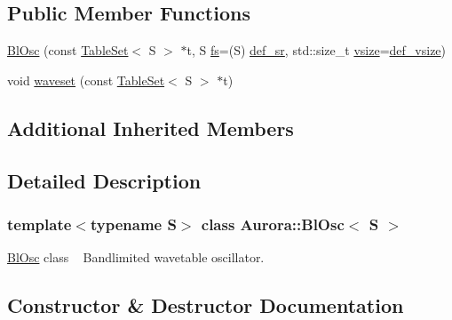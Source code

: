 \subsection*{Public Member Functions}
\begin{DoxyCompactItemize}
\item 
\hyperlink{class_aurora_1_1_bl_osc_a1159b66d0a05dfd677cde07f5547c257}{Bl\+Osc} (const \hyperlink{class_aurora_1_1_table_set}{Table\+Set}$<$ S $>$ $\ast$t, S \hyperlink{class_aurora_1_1_osc_a0a156f9d14f246ea4e7b1cf2bcbf2c4c}{fs}=(S) \hyperlink{namespace_aurora_ad49263d809bea98dd422e95bc91bc03e}{def\+\_\+sr}, std\+::size\+\_\+t \hyperlink{class_aurora_1_1_snd_base_ad68387541cc3d696d0cf58d474f94b73}{vsize}=\hyperlink{namespace_aurora_afaaddf667a06e7ce23c667a8b7295263}{def\+\_\+vsize})
\item 
void \hyperlink{class_aurora_1_1_bl_osc_a7506391ee84bdd698904e4c0f14c446e}{waveset} (const \hyperlink{class_aurora_1_1_table_set}{Table\+Set}$<$ S $>$ $\ast$t)
\end{DoxyCompactItemize}
\subsection*{Additional Inherited Members}


\subsection{Detailed Description}
\subsubsection*{template$<$typename S$>$\newline
class Aurora\+::\+Bl\+Osc$<$ S $>$}

\hyperlink{class_aurora_1_1_bl_osc}{Bl\+Osc} class ~\newline
Bandlimited wavetable oscillator. 

\subsection{Constructor \& Destructor Documentation}
\mbox{\label{class_aurora_1_1_bl_osc_a1159b66d0a05dfd677cde07f5547c257}} 
